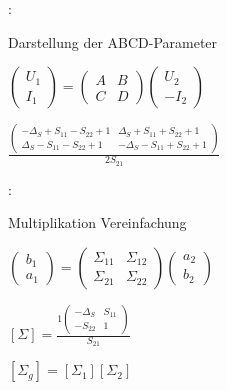 \begin{pitemize}
    \item {}:
    \begin{pitemize}
        \item Darstellung der ABCD-Parameter
        \item $\begin{pmatrix} U_1 \\ I_1 \end{pmatrix}
            =
            \begin{pmatrix} A & B \\ C & D \end{pmatrix}
            \begin{pmatrix} U_2 \\ -I_2 \end{pmatrix}$
        \item $\frac{\begin{pmatrix}
            -\Delta_S + S_{11} - S_{22} + 1 & \Delta_S + S_{11} + S_{22} + 1 \\
            \Delta_S - S_{11} - S_{22} + 1 & -\Delta_S - S_{11} + S_{22} + 1
        \end{pmatrix}}{2S_{21}}$
        \item {}
    \end{pitemize}

    \item {}:
    \begin{pitemize}
        \item Multiplikation Vereinfachung
        \item $\begin{pmatrix} b_1 \\ a_1 \end{pmatrix}
                =
                \begin{pmatrix} \Sigma_{11} & \Sigma_{12} \\ \Sigma_{21} & \Sigma_{22} \end{pmatrix}
                \begin{pmatrix} a_2 \\ b_2 \end{pmatrix}$
        \item $[\Sigma] = \frac{1\begin{pmatrix}
            -\Delta_S & S_{11} \\ -S_{22} & 1
        \end{pmatrix}}{S_{21}}$
        \item {}
        \item {}
        \item $\left[\Sigma_g\right] =  \left[\Sigma_1\right] \left[\Sigma_2\right]$   
    \end{pitemize}
    
\end{pitemize}

